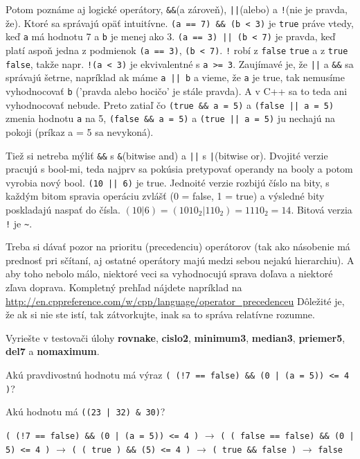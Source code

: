 Potom poznáme aj logické operátory, \verb!&&!(a zároveň), \verb!||!(alebo) a
\verb'!'(nie je pravda, že). Ktoré sa správajú opäť intuitívne.  
\verb!(a == 7) && (b < 3)! je \verb!true! práve vtedy, keď \verb!a! má hodnotu 7 a
\verb!b! je menej ako 3. \verb!(a == 3) || (b < 7)! je pravda, keď platí aspoň jedna
z podmienok \verb!(a == 3)!, \verb!(b < 7)!. \verb'!' robí z 
\verb!false! \verb!true! a z \verb!true! \verb!false!, takže napr. \verb'!(a < 3)' je
ekvivalentné s \verb'a >= 3'.  Zaujímavé je, že \verb!||! a \verb!&&! sa
správajú šetrne, napríklad ak máme \verb!a || b! a vieme, že \verb!a! je true, tak
nemusíme vyhodnocovať \verb!b! ('pravda alebo hocičo' je stále pravda). A v C++ sa
to teda ani vyhodnocovať nebude.  Preto zatiaľ čo \verb!(true && a = 5)! a
\verb!(false || a = 5)!  zmenia hodnotu \verb!a! na 5, \verb!(false && a = 5)! a
\verb!(true || a = 5)! ju nechajú na pokoji (príkaz a = 5 sa nevykoná).

\medskip

Tiež si netreba mýliť \verb!&&! s \verb!&!(bitwise and) a \verb!||! s
\verb!|!(bitwise or). Dvojité verzie pracujú s bool-mi, teda najprv sa pokúsia
pretypovať operandy na booly a potom vyrobia nový bool. \verb!(10 || 6)! je true.
Jednoité verzie rozbijú číslo na bity, s každým bitom spravia operáciu zvlášť
(0 = false, 1 = true) a výsledné bity poskladajú naspať do čísla. 
$(10 | 6) = (1010_2 | 110_2) = 1110_2 = 14$.  Bitová verzia 
\verb'!' je \verb'~'.

Treba si dávať pozor na prioritu (precedenciu) operátorov (tak ako násobenie má
prednosť pri sčítaní, aj ostatné operátory majú medzi sebou nejakú hierarchiu).
A aby toho nebolo málo, niektoré veci sa vyhodnocujú sprava doľava a niektoré
zľava doprava. Kompletný prehľad nájdete napríklad na
\url{http://en.cppreference.com/w/cpp/language/operator\_precedenceu} Dôležité
je, že ak si nie ste istí, tak zátvorkujte, inak sa to správa relatívne
rozumne.

\medskip

Vyriešte v testovači úlohy \textbf{rovnake}, \textbf{cislo2}, \textbf{minimum3},
\textbf{median3}, \textbf{priemer5}, \textbf{del7} a \textbf{nomaximum}.

\cvicenie Akú pravdivostnú hodnotu má výraz 
\verb'( (!7 == false) && (0 | (a = 5)) <= 4 )'?

\cvicenie Akú hodnotu má \verb!((23 | 32) & 30)!? 

\riesenie \verb'( (!7 == false) && (0 | (a = 5)) <= 4 )' $\rightarrow$
\verb'( ( false == false) && (0 | 5) <= 4 )' $\rightarrow$
\verb'( ( true ) && (5) <= 4 )' $\rightarrow$ \verb'( true && false )' $\rightarrow$ \verb'false'


